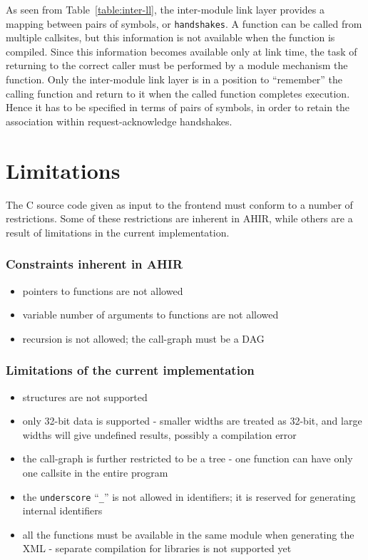 \documentclass[12pt]{article}
\begin{document}
As seen from Table~\ref{table:inter-ll}, the inter-module link layer
provides a mapping between pairs of symbols, or {\tt handshakes}. A
function can be called from multiple callsites, but this information
is not available when the function is compiled. Since this information
becomes available only at link time, the task of returning to the
correct caller must be performed by a module mechanism the function. 
Only the inter-module link layer is in a position to ``remember'' the
calling function and return to it when the called function completes
execution. Hence it has to be specified in terms of pairs of symbols,
in order to retain the association within request-acknowledge
handshakes.

\section{Limitations}

The C source code given as input to the frontend must conform to a
number of restrictions. Some of these restrictions are inherent in
AHIR, while others are a result of limitations in the current
implementation.

\subsubsection*{Constraints inherent in AHIR}
\begin{itemize}
\item pointers to functions are not allowed
\item variable number of arguments to functions are not allowed
\item recursion is not allowed; the call-graph must be a DAG
\end{itemize}

\subsubsection*{Limitations of the current implementation}
\begin{itemize}
\item structures are not supported
\item only 32-bit data is supported - smaller widths are treated as
      32-bit, and large widths will give undefined results, possibly a
      compilation error
\item the call-graph is further restricted to be a tree - one function
      can have only one callsite in the entire program
\item the {\tt underscore} ``{\tt \_}'' is not allowed in identifiers;
      it is reserved for generating internal identifiers
\item all the functions must be available in the same module when
      generating the XML - separate compilation for libraries is not
      supported yet
\end{itemize}
\end{document}
